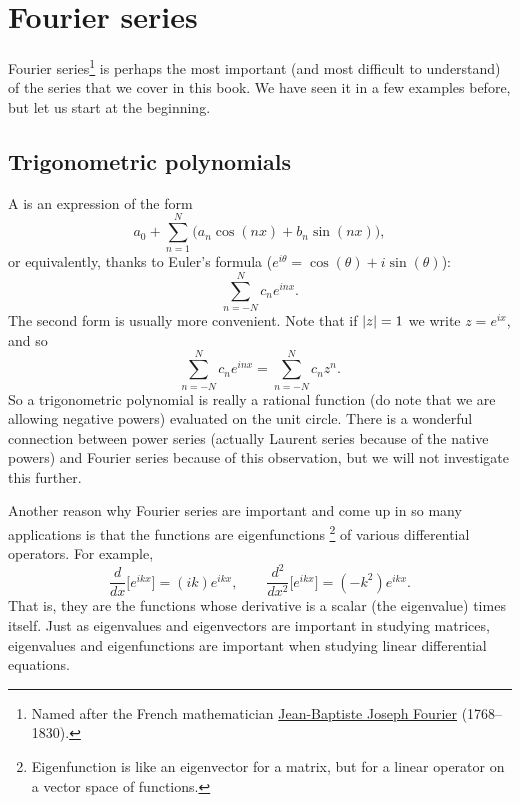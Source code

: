 \sectionnewpage
\section{Fourier series}
\label{sec:fourier}


Fourier series\footnote{%
Named after the French mathematician
\href{https://en.wikipedia.org/wiki/Joseph_Fourier}{Jean-Baptiste Joseph Fourier}
(1768--1830).} is perhaps the most important (and most difficult to
understand) of the series that we cover in
this book.  We have seen it in a few examples before, but let us start
at the beginning.

\subsection{Trigonometric polynomials}

A \emph{} is an expression of the form
\begin{equation*}
a_0 + \sum_{n=1}^N \bigl(a_n \cos(nx) + b_n \sin(nx) \bigr),
\end{equation*}
or equivalently, thanks to Euler's formula ($e^{i\theta} = \cos(\theta) + i
\sin(\theta)$):
\begin{equation*}
\sum_{n=-N}^N c_n e^{inx} .
\end{equation*}
The second form is usually more convenient.  Note that if
$\lvert {z} \rvert=1$ we write $z = e^{ix}$, and so
\begin{equation*}
\sum_{n=-N}^N c_n e^{inx} = 
\sum_{n=-N}^N c_n z^n .
\end{equation*}
So a trigonometric polynomial is really a rational function (do note that
we are allowing negative powers) evaluated on the unit circle.  There is
a wonderful connection between power series (actually Laurent series because
of the native powers) and
Fourier series because of this observation,
but we will not investigate this further.

\medskip

Another reason why Fourier series are important and come up in so many
applications is that the functions are eigenfunctions%
\footnote{Eigenfunction is like an eigenvector for a matrix, but for a linear
operator on a vector space of functions.} of various
differential operators.  For example,
\begin{equation*}
\frac{d}{dx} \bigl[ e^{ikx} \bigr] = (ik) e^{ikx}, \qquad
\frac{d^2}{dx^2} \bigl[ e^{ikx} \bigr] = (-k^2) e^{ikx} .
\end{equation*}
That is, they are the functions whose derivative is a scalar (the
eigenvalue) times itself.
Just as eigenvalues and eigenvectors are important in studying matrices,
eigenvalues and eigenfunctions are important when studying linear
differential equations.

